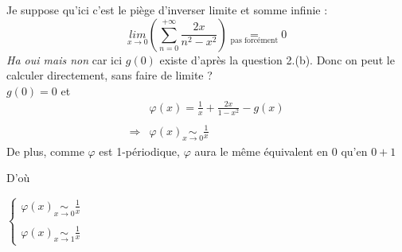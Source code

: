 Je suppose qu'ici c'est le piège d'inverser limite et somme infinie :
\[
  \underset{x\rightarrow0}{lim}\left( \sum\limits_{n=0}^{+\infty} \frac{2x}{n^2-x^2}\right)\underset{\text{pas forcément}}{=}0
\]
\textit{Ha oui mais non} car ici $g(0)$ existe d'après la question 2.(b). Donc on peut le calculer directement, sans faire de limite ?\\
$g(0) = 0$ et
\[
  \begin{array}{rl}
                & \varphi(x) = \frac{1}{x} + \frac{2x}{1-x^2} - g(x)     \\\\
    \Rightarrow & \varphi(x) \underset{x\rightarrow 0}{\sim} \frac{1}{x}
  \end{array}
\]
De plus, comme $\varphi$ est 1-périodique, $\varphi$ aura le même équivalent en $0$ qu'en $0+1$

D'où
\begin{result}
  $
    \left\{
    \begin{array}{c}
      \varphi(x) \underset{x\rightarrow 0}{\sim} \frac{1}{x} \\\\
      \varphi(x) \underset{x\rightarrow 1}{\sim} \frac{1}{x}
    \end{array}
    \right.
  $
\end{result}
